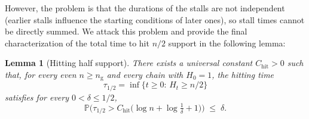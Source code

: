 \documentclass[
    aps,
    superscriptaddress,
    onecolumn,
    10pt,
    prx,
    nofootinbib
]{revtex4-2}
\newtheorem{lemma}{Lemma}
\theoremstyle{namedstatement}
\theoremstyle{plain}
\begin{document}
However, the problem is that the durations of the stalls are not independent (earlier stalls influence the starting conditions of later ones), so stall times cannot be directly summed. We attack this problem and provide the final characterization of the total time to hit $n/2$ support in the following lemma:
\begin{lemma}[Hitting half support]\label{lem:hitting-linear}
There exists a universal constant $C_{\mathrm{hit}}>0$ such that, for every even $n\ge n_{\mathrm g}$ and every chain with $H_0=1$, the hitting time
\begin{equation}
  \tau_{1/2}=\inf\{t\ge0:\,H_t\ge n/2\}
\end{equation}
satisfies for every $0<\delta\le1/2$,
\begin{equation}\label{eq:hit-delta}
  \mathbb P\Big(\tau_{1/2}>C_{\mathrm{hit}}\Big(\log n+\log\tfrac1\delta+1\Big)\Big)
  \;\le\;\delta.
\end{equation}
\end{lemma}
\end{document}
